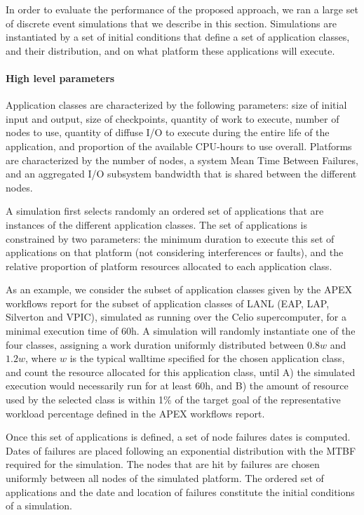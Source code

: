 \documentclass[conference]{IEEEtran}
\begin{document}
In order to evaluate the performance of the proposed approach, we
ran a large set of discrete event simulations that we describe in this
section. Simulations are instantiated by a set of initial conditions
that define a set of application classes, and their distribution, and
on what platform these applications will execute.

\paragraph*{High level parameters}
Application classes are characterized by the following parameters:
size of initial input and output, size of checkpoints, quantity of
work to execute, number of nodes to use, quantity of diffuse I/O to
execute during the entire life of the application, and proportion of
the available CPU-hours to use overall.  Platforms are characterized
by the number of nodes, a system Mean Time Between Failures, and an
aggregated I/O subsystem bandwidth that is shared between the
different nodes.

A simulation first selects randomly an ordered set of applications
that are instances of the different application classes. The set of
applications is constrained by two parameters: the minimum duration to
execute this set of applications on that platform (not considering
interferences or faults), and the relative proportion of platform
resources allocated to each application class.

As an example, we consider the subset of application classes given by
the APEX workflows report for the subset of application classes of
LANL (EAP, LAP, Silverton and VPIC), simulated as running over the
Celio supercomputer, for a minimal execution time of 60h. A simulation
will randomly instantiate one of the four classes, assigning a work
duration uniformly distributed between $0.8w$ and $1.2w$, where $w$ is
the typical walltime specified for the chosen application class, and
count the resource allocated for this application class, until A) the
simulated execution would necessarily run for at least 60h, and B) the
amount of resource used by the selected class is within 1\% of the
target goal of the representative workload percentage defined in the
APEX workflows report.

Once this set of applications is defined, a set of node failures dates
is computed. Dates of failures are placed following an exponential
distribution with the MTBF required for the simulation. The nodes that
are hit by failures are chosen uniformly between all nodes of the
simulated platform. The ordered set of applications and the date and
location of failures constitute the initial conditions of a simulation.
\end{document}

